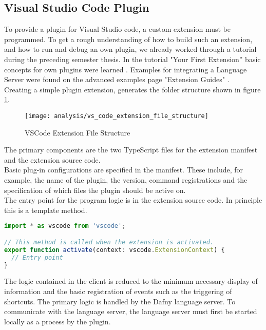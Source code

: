 \subsection{Visual Studio Code Plugin}
To provide a plugin for Visual Studio code, a custom extension must be programmed.
To get a rough understanding of how to build such an extension, and how to run and debug an own plugin, we already worked through a tutorial during the preceding semester thesis.
In the tutorial "Your First Extension” basic concepts for own plugins were learned \cite{vscode-first-extension}.
Examples for integrating a Language Server were found on the advanced examples page "Extension Guides" \cite{vscode-extensions}. \\

Creating a simple plugin extension, generates the folder structure shown in figure \ref{fig:vs_code_extension_file_structure}.

\begin{figure}[H]
    \centering
    \texttt{[image: analysis/vs\_code\_extension\_file\_structure]}
    \caption{VSCode Extension File Structure}
    \label{fig:vs_code_extension_file_structure}
\end{figure}

The primary components are the two TypeScript files for the extension manifest and the extension source code. \\

Basic plug-in configurations are specified in the manifest.
These include, for example, the name of the plugin, the version,
command registrations and the specification of which files the plugin should be active on. \\

The entry point for the program logic is in the extension source code.
In principle this is a template method.

\begin{lstlisting}[language=typescript, caption={extension.ts}, captionpos=b, label={lst:extension-file}]
import * as vscode from 'vscode';

// This method is called when the extension is activated.
export function activate(context: vscode.ExtensionContext) {
  // Entry point
}
\end{lstlisting}

The logic contained in the client is reduced to the minimum necessary display of
information and the basic registration of events such as the triggering of shortcuts.
The primary logic is handled by the Dafny language server.
To communicate with the language server, the language server must first be started locally as a process by the plugin. \\

